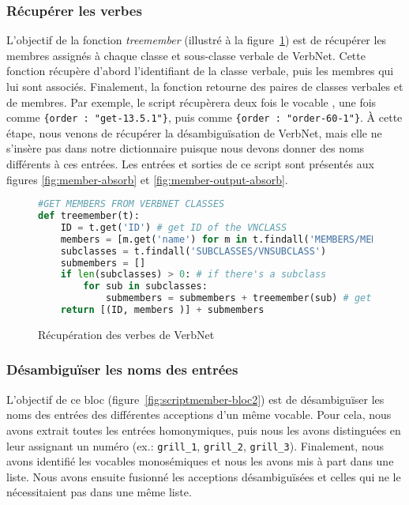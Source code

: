 \subsubsection{Récupérer les verbes}
L'objectif de la fonction \emph{treemember} (illustré à la figure~\ref{fig:scriptmember-bloc1}) est de récupérer les membres assignés à chaque classe et sous-classe verbale de VerbNet. Cette fonction récupère d'abord l'identifiant de la classe verbale, puis les membres qui lui sont associés. Finalement, la fonction retourne des paires de classes verbales et de membres. Par exemple, le script récupèrera deux fois le vocable , une fois comme \lstinline|{order : "get-13.5.1"}|, puis comme \lstinline|{order : "order-60-1"}|. À cette étape, nous venons de récupérer la désambiguïsation de VerbNet, mais elle ne s'insère pas dans notre dictionnaire puisque nous devons donner des noms différents à ces entrées. Les entrées et sorties de ce script sont présentés aux figures \ref{fig:member-absorb} et \ref{fig:member-output-absorb}.

\begin{figure}[htb]
\begin{lstlisting}[language=Python]
#GET MEMBERS FROM VERBNET CLASSES
def treemember(t):
    ID = t.get('ID') # get ID of the VNCLASS
    members = [m.get('name') for m in t.findall('MEMBERS/MEMBER')] # get members 
    subclasses = t.findall('SUBCLASSES/VNSUBCLASS')
    submembers = []
    if len(subclasses) > 0: # if there's a subclass
        for sub in subclasses:
            submembers = submembers + treemember(sub) # get ID of the subclass and members
    return [(ID, members )] + submembers
\end{lstlisting}
  \caption{Récupération des verbes de VerbNet}
	\label{fig:scriptmember-bloc1}
\end{figure}

\subsubsection{Désambiguïser les noms des entrées}

L'objectif de ce bloc (figure~\ref{fig:scriptmember-bloc2}) est de désambiguïser les noms des entrées des différentes acceptions d'un même vocable. Pour cela, nous avons extrait toutes les entrées homonymiques, puis nous les avons distinguées en leur assignant un numéro (ex.: \texttt{grill\_1}, \texttt{grill\_2}, \texttt{grill\_3}). Finalement, nous avons identifié les vocables monosémiques et nous les avons mis à part dans une liste. Nous avons ensuite fusionné les acceptions désambiguïsées et celles qui ne le nécessitaient pas dans une même liste.

